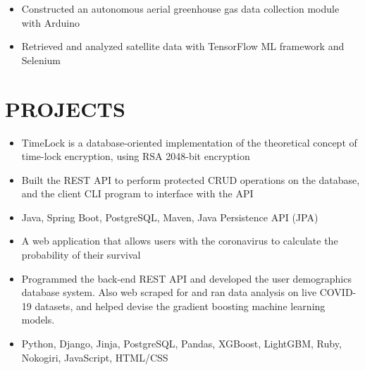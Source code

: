 \documentclass[11pt,letterpaper]{article}
\begin{document}
  {\fontsize{12}{12}}

  \begin{itemize}
    \item{Constructed an autonomous aerial greenhouse gas data collection module with Arduino}
    
    \item{Retrieved and analyzed satellite data with TensorFlow ML framework and Selenium}
  \end{itemize}

  \bigskip

  
  \section*{PROJECTS}

  \iftimelock
    {\fontsize{12}{12}}

    \begin{itemize}
      \item{TimeLock is a database-oriented implementation of the theoretical concept of time-lock encryption, using RSA 2048-bit encryption}

      \item{Built the REST API to perform protected CRUD operations on the database, and the client CLI program to interface with the API}

      \item{
        {}
        Java, Spring Boot, PostgreSQL, Maven, Java Persistence API (JPA)
      }
    \end{itemize}
  \fi

  \ifcovidsurvivalcalculator
    {\fontsize{12}{12}}

    \begin{itemize}
      \item{A web application that allows users with the coronavirus to calculate the probability of their survival}

      \item{Programmed the back-end REST API and developed the user demographics database system. Also web scraped for and ran data analysis on live COVID-19 datasets, and helped devise the gradient boosting machine learning models.}

      \item{
        {}
        Python, Django, Jinja, PostgreSQL, Pandas, XGBoost, LightGBM, Ruby, Nokogiri, JavaScript, HTML/CSS
      }
    \end{itemize}
  \fi
\end{document}
